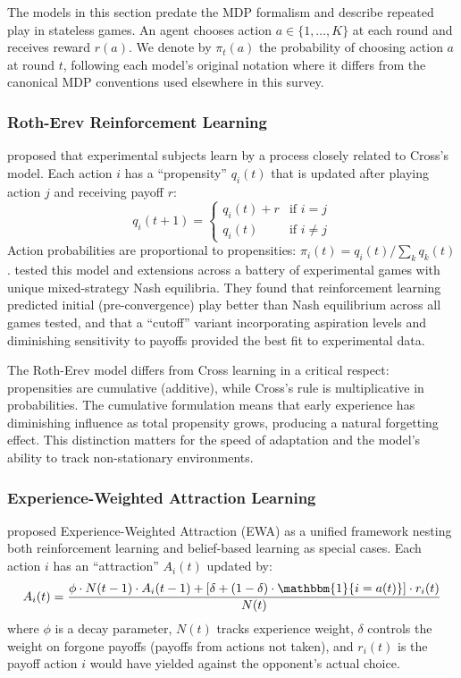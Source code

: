The models in this section predate the MDP formalism and describe repeated play in stateless games. An agent chooses action $a \in \{1, \ldots, K\}$ at each round and receives reward $r(a)$. We denote by $\pi_t(a)$ the probability of choosing action $a$ at round $t$, following each model's original notation where it differs from the canonical MDP conventions used elsewhere in this survey.

\subsubsection{Roth-Erev Reinforcement Learning}

\citet{RothErev1995} proposed that experimental subjects learn by a process closely related to Cross's model. Each action $i$ has a ``propensity'' $q_i(t)$ that is updated after playing action $j$ and receiving payoff $r$:
\begin{equation}
q_i(t+1) = \begin{cases}
q_i(t) + r & \text{if } i = j \\
q_i(t) & \text{if } i \neq j
\end{cases}
\end{equation}
Action probabilities are proportional to propensities: $\pi_i(t) = q_i(t) / \sum_k q_k(t)$. \citet{ErevRoth1998} tested this model and extensions across a battery of experimental games with unique mixed-strategy Nash equilibria. They found that reinforcement learning predicted initial (pre-convergence) play better than Nash equilibrium across all games tested, and that a ``cutoff'' variant incorporating aspiration levels and diminishing sensitivity to payoffs provided the best fit to experimental data.

The Roth-Erev model differs from Cross learning in a critical respect: propensities are cumulative (additive), while Cross's rule is multiplicative in probabilities. The cumulative formulation means that early experience has diminishing influence as total propensity grows, producing a natural forgetting effect. This distinction matters for the speed of adaptation and the model's ability to track non-stationary environments.

\subsubsection{Experience-Weighted Attraction Learning}

\citet{CamererHo1999} proposed Experience-Weighted Attraction (EWA) as a unified framework nesting both reinforcement learning and belief-based learning as special cases. Each action $i$ has an ``attraction'' $A_i(t)$ updated by:
\begin{equation}
A_i(t) = \frac{\phi \cdot N(t-1) \cdot A_i(t-1) + [\delta + (1-\delta) \cdot \mathbbm{1}\{i = a(t)\}] \cdot r_i(t)}{N(t)}
\end{equation}
where $\phi$ is a decay parameter, $N(t)$ tracks experience weight, $\delta$ controls the weight on forgone payoffs (payoffs from actions not taken), and $r_i(t)$ is the payoff action $i$ would have yielded against the opponent's actual choice.

